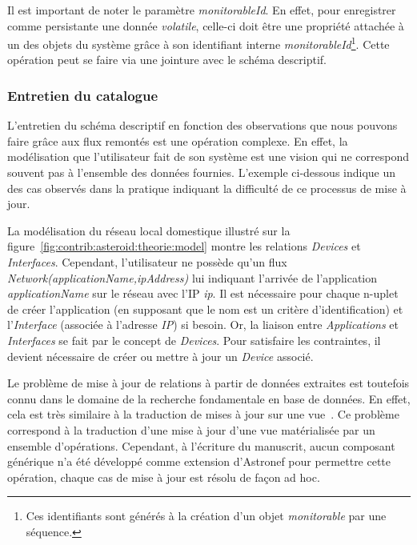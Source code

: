Il est important de noter le paramètre \textit{monitorableId}. En effet, pour enregistrer comme persistante une donnée \textit{volatile}, celle-ci doit être une propriété attachée à un des objets du système grâce à son identifiant interne \textit{monitorableId}\footnote{Ces identifiants sont générés à la création d'un objet \textit{monitorable} par une séquence.}. Cette opération peut se faire via une jointure avec le schéma descriptif.

\subsubsection{Entretien du catalogue}
L'entretien du schéma descriptif en fonction des observations que nous pouvons faire grâce aux flux remontés est une opération complexe. En effet, la modélisation que l'utilisateur fait de son système est une vision qui ne correspond souvent pas à l'ensemble des données fournies. L'exemple ci-dessous indique un des cas observés dans la pratique indiquant la difficulté de ce processus de mise à jour.

\begin{example}
La modélisation du réseau local domestique illustré sur la figure~\ref{fig:contrib:asteroid:theorie:model} montre les relations \textit{Devices} et \textit{Interfaces}. Cependant, l'utilisateur ne possède qu'un flux \textit{Network(applicationName,ipAddress)} lui indiquant l'arrivée de l'application \textit{applicationName} sur le réseau avec l'IP \textit{ip}. Il est nécessaire pour chaque n-uplet de créer l'application (en supposant que le nom est un critère d'identification) et l'\textit{Interface} (associée à l'adresse \textit{IP}) si besoin. Or, la liaison entre \textit{Applications} et \textit{Interfaces} se fait par le concept de \textit{Devices}. Pour satisfaire les contraintes, il devient nécessaire de créer ou mettre à jour un \textit{Device} associé.
\end{example}

Le problème de mise à jour de relations à partir de données extraites est toutefois connu dans le domaine de la recherche fondamentale en base de données. En effet, cela est très similaire à la traduction de mises à jour sur une vue~\cite{Keller:viewupdate}. Ce problème correspond à la traduction d'une mise à jour d'une vue matérialisée par un ensemble d'opérations. Cependant, à l'écriture du manuscrit, aucun composant générique n'a été développé comme extension d'Astronef pour permettre cette opération, chaque cas de mise à jour est résolu de façon ad hoc.
